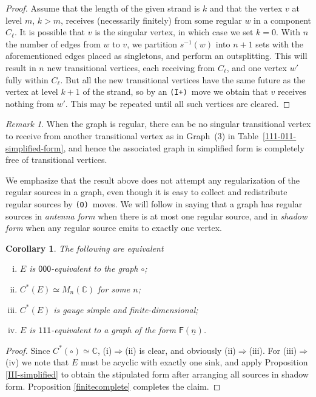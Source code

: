 \documentclass[12pt]{amsbook}%
\newtheorem{corol}[theor]{Corollary}
\theoremstyle{defin}
\theoremstyle{remark}
\newtheorem{remar}[theor]{Remark}
\numberwithin{equation}{chapter}
\numberwithin{theor}{section}
\newcommand{\CC}{\mathbb{C}}
\newcommand{\xyz}[1]{\mbox{$\mathsf{#1}$}}
\newcommand{\IIIp}{\mbox{\texttt{\textup{(I+)}}}}
\newcommand{\OOO}{\mbox{\texttt{\textup{(O)}}}}
\newcommand{\GF}{{\mathsf F}}
\begin{document}
\begin{proof}
Assume that the length of the given strand is $k$ and that the vertex $v$ at level $m$, $k>m$, receives (necessarily finitely) from some regular $w$ in a component $C_\ell$. It is possible that $v$ is the singular vertex, in which case we set $k=0$. With $n$ the number of edges from $w$ to $v$, we partition $s^{-1}(w)$ into $n+1$ sets with the aforementioned edges placed as singletons, and perform an outsplitting. This will result in $n$ new transitional vertices, each receiving from $C_\ell$, and one vertex $w'$ fully within $C_\ell$. But all the new transitional vertices have the same future as the vertex at level $k+1$ of the strand, so by an \IIIp\ move we obtain that $v$ receives nothing from $w'$. This may be repeated until all such vertices are cleared.
\end{proof}

\begin{remar}
When the graph is regular, there can be no singular transitional vertex to receive from another transitional vertex as in Graph~(3) in Table~\ref{111-011-simplified-form}, and hence the associated graph in simplified form is completely free of transitional vertices. \end{remar}


We emphasize that the result above does not attempt any regularization of the regular sources in a graph, even though it is easy to collect and redistribute regular sources by \OOO\ moves. We will follow \cite{seaseer:gciugc} in saying that a graph has regular sources in \emph{antenna form} when there is at most one regular source, and in \emph{shadow form} when any regular source emits to exactly one vertex.

\begin{corol}\label{reducetoGF}
The following are equivalent
\begin{enumerate}[(i)]
\item $E$ is \xyz{000}-equivalent to the graph $\circ$;
\item $C^*(E)\simeq M_n(\CC)$ for some $n$;
\item $C^*(E)$ is gauge simple and finite-dimensional;
\item $E$ is \xyz{111}-equivalent to a graph of the form $\GF(\underline n)$.
\end{enumerate}
\end{corol}
\begin{proof} 
Since $C^*(\circ)\simeq \CC$, (i)$\Longrightarrow$(ii) is clear, and obviously (ii)$\Longrightarrow$(iii). For (iii)$\Longrightarrow$(iv) we note that $E$ must be acyclic with exactly one sink, and apply Proposition \ref{III-simplified} to obtain the stipulated form after arranging all sources in shadow form. Proposition \ref{finitecomplete} completes the claim.
\end{proof}
\end{document}
